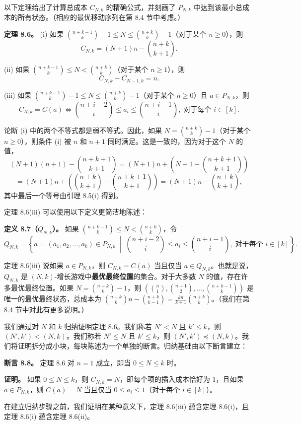\documentclass[12pt,a4paper]{ctexart}
\theoremstyle{remark}
\begin{document}
以下定理给出了计算总成本 $C_{N,k}$ 的精确公式，并刻画了 $P_{N,k}$ 中达到该最小总成本的所有状态。（相应的最优移动序列在第 8.4 节中考虑。）

\textbf{定理 8.6。} (i) 如果 $\binom{n+k-1}{k}-1\leq N\leq\binom{n+k}{k}-1$（对于某个 $n\geq 0$），则
$$C_{N,k}=(N+1)n-\binom{n+k}{k+1}.$$

(ii) 如果 $\binom{n+k-1}{k}\leq N<\binom{n+k}{k}$（对于某个 $n\geq 1$），则
$$C_{N,k}-C_{N-1,k}=n.$$

(iii) 如果 $\binom{n+k-1}{k}-1\leq N\leq\binom{n+k}{k}-1$（对于某个 $n\geq 0$）且 $a\in P_{N,k}$，则
$$C_{N,k}=C(a) \iff \binom{n+i-2}{i}\leq a_i\leq\binom{n+i-1}{i},\; \text{对于每个 } i\in[k].$$

论断 (i) 中的两个不等式都是弱不等式。因此，如果 $N=\binom{n+k}{k}-1$（对于某个 $n\geq 0$），则条件 (i) 被 $n$ 和 $n+1$ 同时满足。这是一致的，因为对于这个 $N$ 的值，
$$(N+1)(n+1)-\binom{n+k+1}{k+1} = (N+1)n + \left(N+1-\binom{n+k+1}{k+1}\right)$$
$$= (N+1)n + \left(\binom{n+k}{k+1}-\binom{n+k+1}{k+1}\right) = (N+1)n - \binom{n+k}{k+1},$$
其中最后一个等号由引理 8.5(i) 得到。

定理 8.6(iii) 可以使用以下定义更简洁地陈述：

\textbf{定义 8.7（$Q_{N,k}$）。} 如果 $\binom{n+k-1}{k}\leq N<\binom{n+k}{k}$，令
$$Q_{N,k}=\left\{ a=(a_1,a_2,\ldots,a_k)\in P_{N,k} \;\middle|\; \binom{n+i-2}{i}\leq a_i\leq\binom{n+i-1}{i},\; \text{对于每个 } i\in[k] \right\}.$$

定理 8.6(iii) 说如果 $a\in P_{N,k}$，则 $C_{N,k}=C(a)$ 当且仅当 $a\in Q_{N,k}$。也就是说，$Q_{N,k}$ 是 $(N,k)$-增长游戏中\textbf{最优最终位置}的集合。对于大多数 $N$ 的值，存在许多最优最终位置。如果 $N=\binom{n+k}{k}-1$，则 $(\binom{n}{1},\binom{n+1}{2},\ldots,\binom{n+k-1}{k})$ 是唯一的最优最终状态，总成本为 $\binom{n+k}{k}n-\binom{n+k}{k-1}=\frac{kn}{k+1}\binom{n+k}{k}$。（我们在第 8.4 节中对此有更多说明。）

我们通过对 $N$ 和 $k$ 归纳证明定理 8.6。我们称若 $N'<N$ 且 $k'\leq k$，则 $(N',k')<(N,k)$。我们称若 $N'\leq N$ 且 $k'\leq k$，则 $(N',k')\preceq(N,k)$。我们将证明拆分成小块，每块陈述为一个单独的断言。归纳基础由以下断言建立：

\textbf{断言 8.8。} 定理 8.6 对 $n=1$ 成立，即当 $0\leq N\leq k$ 时。

\textbf{证明。} 如果 $0\leq N\leq k$，则 $C_{N,k}=N$，即每个项的插入成本恰好为 1，且如果 $a\in P_{N,k}$，则 $C(a)=N$ 当且仅当 $0\leq a_i\leq 1$（对于每个 $i\in[k]$）。

在建立归纳步骤之前，我们证明在某种意义下，定理 8.6(iii) 蕴含定理 8.6(i)，且定理 8.6(i) 蕴含定理 8.6(ii)。
\end{document}
